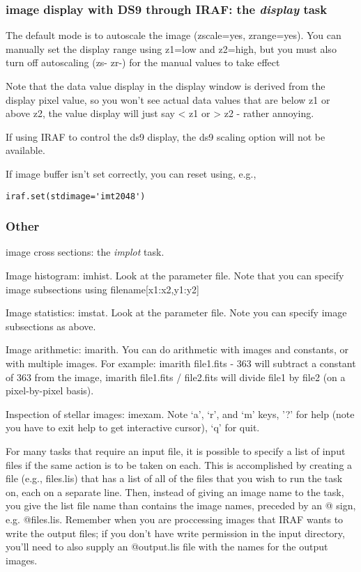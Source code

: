 \documentclass{article}
\begin{document}
\subsubsection*{image display with DS9 through IRAF: the
\emph{display} task}

The default mode is to autoscale the image (zscale=yes, zrange=yes).
You can manually set the display range using z1=low and z2=high, but
you must also turn off autoscaling (zs- zr-) for the manual values to
take effect

Note that the data value display in the display window is derived from
the display pixel value, so you won't see actual data values that are
below z1 or above z2, the value display will just say < z1 or > z2 -
rather annoying.

If using IRAF to control the ds9 display, the ds9 scaling option will
not be available.

If image buffer isn't set correctly, you can reset using, e.g.,

\verb|iraf.set(stdimage='imt2048')|

\subsubsection*{Other}

image cross sections: the \emph{implot} task.

Image histogram: imhist. Look at the parameter file. Note that you can
specify image subsections using filename[x1:x2,y1:y2]

Image statistics: imstat. Look at the parameter file. Note you can
specify image subsections as above.

Image arithmetic: imarith. You can do arithmetic with images and
constants, or with multiple images. For example: imarith file1.fits -
363 will subtract a constant of 363 from the image, imarith file1.fits
/ file2.fits will divide file1 by file2 (on a pixel-by-pixel basis).

Inspection of stellar images: imexam. Note `a', `r', and `m' keys, '?'
for help (note you have to exit help to get interactive cursor), `q'
for quit.

For many tasks that require an input file, it is possible to specify a
list of input files if the same action is to be taken on each. This is
accomplished by creating a file (e.g., files.lis) that has a list of
all of the files that you wish to run the task on, each on a separate
line. Then, instead of giving an image name to the task, you give the
list file name than contains the image names, preceded by an @ sign,
e.g. @files.lis. Remember when you are proccessing images that IRAF
wants to write the output files; if you don't have write permission in
the input directory, you'll need to also supply an @output.lis file
with the names for the output images.
\end{document}
